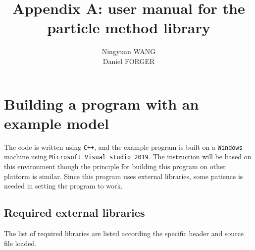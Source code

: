 \documentclass[10pt]{article} %
\title{Appendix A: user manual for the particle method library}
\author{\sc Ningyuan WANG\\Daniel FORGER
}
\begin{document}
\setlength{\parindent}{0pt}
\maketitle
\section{Building a program with an example model}
The code is written using \texttt{C++}, and the example program is built on a \texttt{Windows} machine using \texttt{Microsoft Visual studio 2019}. The instruction will be based on this environment though the principle for building this program on other platform is similar. Since this program uses external libraries, some patience is needed in setting the program to work.
\subsection{Required external libraries}
The list of required libraries are listed according the specific header and source file loaded. 
\end{document}
